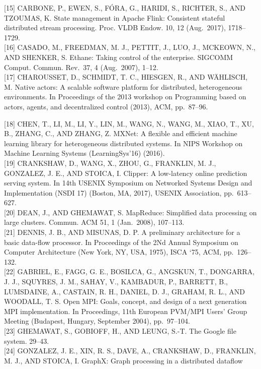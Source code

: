 \documentclass[
]{article}
\begin{document}
{[}15{]} CARBONE, P., EWEN, S., FÓRA, G., HARIDI, S., RICHTER, S., AND
TZOUMAS, K. State management in Apache Flink: Consistent stateful
distributed stream processing. Proc. VLDB Endow. 10, 12 (Aug.~2017),
1718--1729.\\
{[}16{]} CASADO, M., FREEDMAN, M. J., PETTIT, J., LUO, J., MCKEOWN, N.,
AND SHENKER, S. Ethane: Taking control of the enterprise. SIGCOMM
Comput. Commun. Rev.~37, 4 (Aug.~2007), 1--12.\\
{[}17{]} CHAROUSSET, D., SCHMIDT, T. C., HIESGEN, R., AND WÄHLISCH, M.
Native actors: A scalable software platform for distributed,
heterogeneous environments. In Proceedings of the 2013 workshop on
Programming based on actors, agents, and decentralized control (2013),
ACM, pp.~87--96.

{[}18{]} CHEN, T., LI, M., LI, Y., LIN, M., WANG, N., WANG, M., XIAO,
T., XU, B., ZHANG, C., AND ZHANG, Z. MXNet: A flexible and efficient
machine learning library for heterogeneous distributed systems. In NIPS
Workshop on Machine Learning Systems (LearningSys'16) (2016).\\
{[}19{]} CRANKSHAW, D., WANG, X., ZHOU, G., FRANKLIN, M. J., GONZALEZ,
J. E., AND STOICA, I. Clipper: A low-latency online prediction serving
system. In 14th USENIX Symposium on Networked Systems Design and
Implementation (NSDI 17) (Boston, MA, 2017), USENIX Association,
pp.~613--627.\\
{[}20{]} DEAN, J., AND GHEMAWAT, S. MapReduce: Simplified data
processing on large clusters. Commun. ACM 51, 1 (Jan.~2008), 107--113.\\
{[}21{]} DENNIS, J. B., AND MISUNAS, D. P. A preliminary architecture
for a basic data-flow processor. In Proceedings of the 2Nd Annual
Symposium on Computer Architecture (New York, NY, USA, 1975), ISCA `75,
ACM, pp.~126--132.\\
{[}22{]} GABRIEL, E., FAGG, G. E., BOSILCA, G., ANGSKUN, T., DONGARRA,
J. J., SQUYRES, J. M., SAHAY, V., KAMBADUR, P., BARRETT, B., LUMSDAINE,
A., CASTAIN, R. H., DANIEL, D. J., GRAHAM, R. L., AND WOODALL, T. S.
Open MPI: Goals, concept, and design of a next generation MPI
implementation. In Proceedings, 11th European PVM/MPI Users' Group
Meeting (Budapest, Hungary, September 2004), pp.~97--104.\\
{[}23{]} GHEMAWAT, S., GOBIOFF, H., AND LEUNG, S.-T. The Google file
system. 29--43.\\
{[}24{]} GONZALEZ, J. E., XIN, R. S., DAVE, A., CRANKSHAW, D., FRANKLIN,
M. J., AND STOICA, I. GraphX: Graph processing in a distributed dataflow
\end{document}
